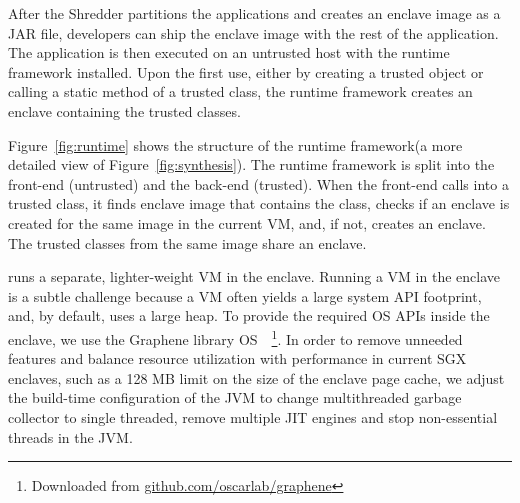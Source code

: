 After the Shredder partitions the applications
and creates an enclave image as a JAR file,
developers can ship the enclave image with the rest of the application.
The application is then executed on an untrusted host with the 
\sysname{} runtime framework installed.
Upon the first use, either by creating a trusted object or calling a static method of a trusted class,
the \sysname{} runtime framework creates an enclave containing the trusted classes.


Figure~\ref{fig:runtime} shows the structure of the \sysname{} runtime framework(a more detailed view of Figure~\ref{fig:synthesis}).
The \sysname{} runtime framework is split into the front-end (untrusted) and the back-end (trusted).
When the front-end calls into a trusted class,
it finds enclave image that contains the class,
checks if an enclave is created for the same image in the current \java{} VM,
and, if not, creates an enclave.
The trusted classes from the same image share an enclave.

\sysname{} runs a separate, lighter-weight \java{} VM in the enclave.
Running a \java{} VM in the enclave is a subtle challenge because a \java{} VM
often yields a large system API footprint, and, by default, uses a large heap. %
To provide the required OS APIs inside the enclave, we use the Graphene library OS~\citep{tsai14graphene}~\footnote{Downloaded from \url{github.com/oscarlab/graphene}}.
In order to remove unneeded features and balance resource utilization with performance in current SGX enclaves, such as
a 128 MB limit on the size of the enclave page cache,
we adjust the build-time configuration of the JVM to change multithreaded garbage collector to single threaded, remove multiple JIT engines and stop non-essential threads in the JVM. 



